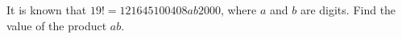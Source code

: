 It is known that $19!=121645100408ab2000$, where $a$ and $b$ are digits. Find the value of the product $ab$.
